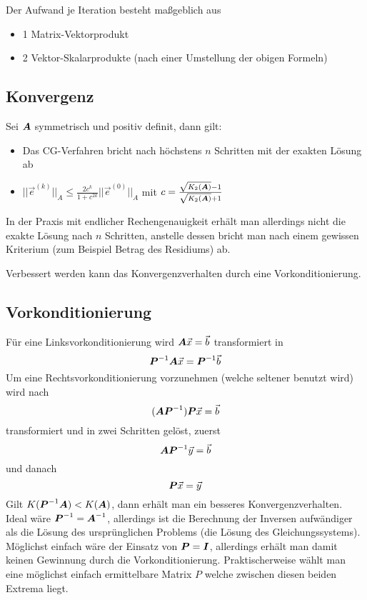 Der Aufwand je Iteration besteht maßgeblich aus
\begin{itemize}
	\item 1 Matrix-Vektorprodukt
	\item 2 Vektor-Skalarprodukte (nach einer Umstellung der obigen Formeln)
\end{itemize}

\subsection{Konvergenz} Sei $\boldsymbol {A}$ symmetrisch und positiv definit, dann gilt:
\begin{itemize}
	\item Das CG-Verfahren bricht nach höchstens $n$ Schritten mit der exakten Lösung ab
	\item $||\vec{e}^{(k)}||_A \le \frac{2 c^k}{1 + c^{2k}} ||\vec{e}^{(0)}||_A$ mit $c = \frac{\sqrt{K_2(\boldsymbol {A})} - 1}{\sqrt{K_2(\boldsymbol {A})} + 1}$
\end{itemize}
In der Praxis mit endlicher Rechengenauigkeit erhält man allerdings nicht die exakte Lösung nach $n$ Schritten, anstelle dessen bricht man nach einem gewissen Kriterium (zum Beispiel Betrag des Residiums) ab.

Verbessert werden kann das Konvergenzverhalten durch eine Vorkonditionierung.

\subsection{Vorkonditionierung} Für eine Linksvorkonditionierung wird $\boldsymbol {A} \vec{x} = \vec{b}$ transformiert in
\begin{equation}
	\boldsymbol {P}^{-1} \boldsymbol {A} \vec{x} = \boldsymbol {P}^{-1} \vec{b}
\end{equation}
Um eine Rechtsvorkonditionierung vorzunehmen (welche seltener benutzt wird) wird nach
\begin{equation}
	(\boldsymbol {A} \boldsymbol {P}^{-1}) \boldsymbol {P} \vec{x} = \vec{b}
\end{equation}
transformiert und in zwei Schritten gelöst, zuerst
\begin{equation}
	\boldsymbol {A} \boldsymbol {P}^{-1} \vec{y} = \vec{b}
\end{equation}
und danach
\begin{equation}
	\boldsymbol {P} \vec{x} = \vec{y}
\end{equation}
Gilt $K(\boldsymbol {P}^{-1} \boldsymbol {A}) < K(\boldsymbol {A})$, dann erhält man ein besseres Konvergenzverhalten. Ideal wäre $\boldsymbol {P}^{-1} = \boldsymbol {A}^{-1}$, allerdings ist die Berechnung der Inversen aufwändiger als die Lösung des ursprünglichen Problems (die Lösung des Gleichungssystems). Möglichst einfach wäre der Einsatz von $\boldsymbol {P} = \boldsymbol {I}$, allerdings erhält man damit keinen Gewinnung durch die Vorkonditionierung. Praktischerweise wählt man eine möglichst einfach ermittelbare Matrix $P$ welche zwischen diesen beiden Extrema liegt.

